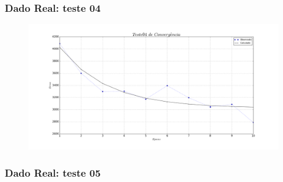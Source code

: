 \documentclass[aspectratio=10]{beamer} %
\begin{document}
\begin{frame}
	\frametitle{Dado Real: teste 04}
	\begin{figure}[H]
		\centering
		\includegraphics[scale=0.2]{Imagens/conv04.png}
	\end{figure} 
\end{frame}

\begin{frame}
	\frametitle{Dado Real: teste 05}
	\begin{figure}[H]
		\centering
		\qquad
		\qquad
		\qquad
		\label{SOMt05}
	\end{figure}
\end{frame}
\end{document}
